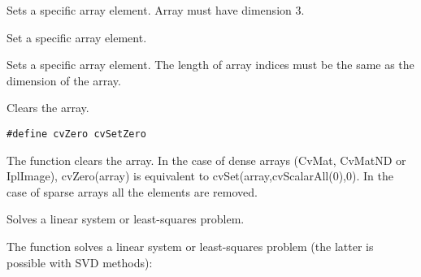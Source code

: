 Sets a specific array element.  Array must have dimension 3.

Set a specific array element.


\begin{description}
\end{description}

Sets a specific array element.  The length of array indices must be the same as the dimension of the array.
\fi %

Clears the array.


\ifC
\begin{lstlisting}
#define cvZero cvSetZero
\end{lstlisting}
\fi

\begin{description}
\end{description}

The function clears the array. In the case of dense arrays (CvMat, CvMatND or IplImage), cvZero(array) is equivalent to cvSet(array,cvScalarAll(0),0).
In the case of sparse arrays all the elements are removed.

Solves a linear system or least-squares problem.


\begin{description}
\end{description}

The function solves a linear system or least-squares problem (the latter is possible with SVD methods):

